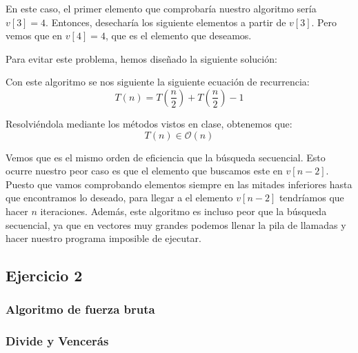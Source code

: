 \documentclass[10pt,a4paper]{article}
\begin{document}
En este caso, el primer elemento que comprobaría nuestro algoritmo sería \(v[3] = 4\). Entonces, desecharía los siguiente elementos a partir de \(v[3]\). Pero vemos que en \(v[4] = 4\), que es el elemento que deseamos. 

Para evitar este problema, hemos diseñado la siguiente solución:



Con este algoritmo se nos siguiente la siguiente ecuación de recurrencia:
\[
	T(n) = T \left( \frac{n}{2} \right) + T \left( \frac{n}{2} \right) - 1
\]

Resolviéndola mediante los métodos vistos en clase, obtenemos que:
\[
	T(n) \in \mathcal{O}(n)
\]

Vemos que es el mismo orden de eficiencia que la búsqueda secuencial. Esto ocurre nuestro peor caso es que el elemento que buscamos este en \(v[n-2]\). Puesto que vamos comprobando elementos siempre en las mitades inferiores hasta que encontramos lo deseado, para llegar a el elemento \(v[n-2]\) tendríamos que hacer \(n\) iteraciones. Además, este algoritmo es incluso peor que la búsqueda secuencial, ya que en vectores muy grandes podemos llenar la pila de llamadas y hacer nuestro programa imposible de ejecutar.

\subsection{Ejercicio 2}

\subsubsection{Algoritmo de fuerza bruta}

\subsubsection{Divide y Vencerás}
\end{document}
